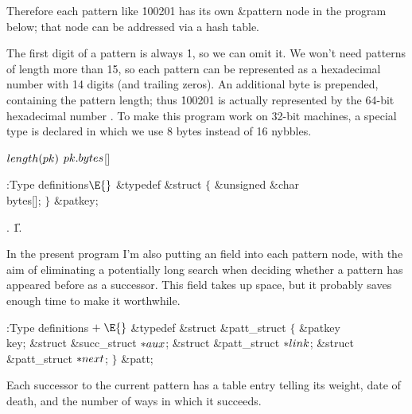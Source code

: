 Therefore each pattern like \.{100201} has its own \&{pattern} node in the
program below; that node can be addressed via a hash table.

The first digit of a pattern is always \.1, so we can omit it. We won't need
patterns of length more than 15, so each pattern can be represented as
a hexadecimal number with 14 digits (and trailing zeros). An additional
byte is prepended, containing the pattern length;
thus \.{100201} is actually represented by the 64-bit hexadecimal number
. To make this program work on 32-bit machines,
a special type is declared in which we use 8 bytes instead of 16 nybbles.

\Y\B\4\D$\\{length}(\\{pk})$ \5
$\\{pk}.\\{bytes}{}$[]\par
\Y\B\4:Type definitions\X${}\E{}$\6
\&{typedef} \&{struct} ${}\{{}$\1\6
\&{unsigned} \&{char} \\{bytes}[];\2\6
${}\}{}$ \&{patkey};\par
{}.
\U1.\fi

In the present program I'm also putting an 
field into each pattern
node, with the aim of eliminating a potentially long search when deciding
whether a pattern has appeared before as a successor. This field takes
up space, but it probably saves enough time to make it worthwhile.

\Y\B\4:Type definitions\X${}\mathrel+\E{}$\6
\&{typedef} \&{struct} \&{patt\_struct} ${}\{{}$\1\6
\&{patkey} \\{key};\6
\&{struct} \&{succ\_struct} ${}{*}\\{aux}{}$;%
\6
\&{struct} \&{patt\_struct} ${}{*}\\{link}{}$;\6
\&{struct} \&{patt\_struct} ${}{*}\\{next}{}$;\2\6
${}\}{}$ \&{patt};\par
\fi

Each successor to the current pattern
has a table entry telling its weight, date of death,
and the number of ways in which it succeeds.

